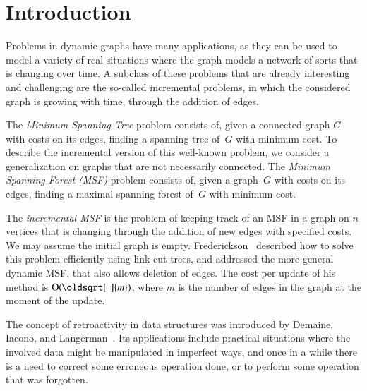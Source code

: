 \documentclass[3p,times,procedia]{elsarticle}
\renewcommand{\sqrt}[2][\mkern8mu]{\mkern-1mu\mathop{\oldsqrt[#1]{#2}}}
\newcommand{\Oh}{\mathrm{O}}
\begin{document}

\vspace*{-6pt}

\section{Introduction}
\label{Introduction}

Problems in dynamic graphs have many applications, as they can be used to model a variety 
of real situations where the graph models a network of sorts that is changing over time. 
A subclass of these problems that are already interesting and challenging are the so-called 
incremental problems, in which the considered graph is growing with time, through the 
addition of edges.  

The \emph{Minimum Spanning Tree} problem consists of, given a connected 
graph $G$ with costs on its edges, finding a spanning tree of~$G$ with minimum cost. 
To describe the incremental version of this well-known problem, 
we consider a generalization on graphs that are not necessarily connected. 
The \emph{Minimum Spanning Forest (MSF)} problem consists of, given a graph~$G$ with 
costs on its edges, finding a maximal spanning forest of~$G$ with minimum cost. 

The \emph{incremental MSF} is the problem of keeping track of an MSF in a graph on 
$n$ vertices that is changing through the addition of new edges with specified costs.  
We may assume the initial graph is empty. 
Frederickson~\cite{Frederickson1983} described how to solve this problem efficiently 
using link-cut trees, and addressed the more general dynamic MSF,
that also allows deletion of edges.  The cost per update of his method is $\Oh(\sqrt{m})$, 
where $m$ is the number of edges in the graph at the moment of the update.

The concept of retroactivity in data structures was introduced by Demaine, Iacono, 
and Langerman~\cite{DemaineIL2007}.  Its applications include practical situations 
where the involved data might be manipulated in imperfect ways, and once in a while 
there is a need to correct some erroneous operation done, or to perform some operation 
that was forgotten.
\end{document}
